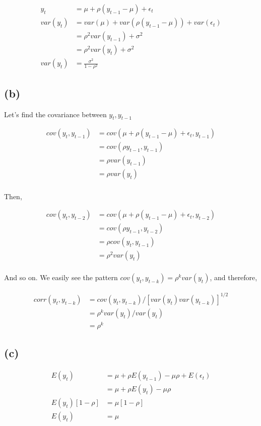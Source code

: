 \documentclass[11pt]{article}
\begin{document}
\begin{align*}
    y_t &= \mu + \rho(y_{t-1} -\mu) + \epsilon_t \\
     var(y_t) &= var(\mu) + var(\rho(y_{t-1} -\mu)) + var(\epsilon_t) \\
     &= \rho^2var(y_{t-1}) + \sigma^2\\
      &= \rho^2var(y_{t}) + \sigma^2\\
      var(y_t) &= \frac{\sigma^2}{1-\rho^2}
\end{align*}

\subsection*{(b)}

Let's find the covariance between $y_t, y_{t-1}$

\begin{align*}
    cov(y_t, y_{t-1}) &= cov(\mu + \rho(y_{t-1}-\mu) + \epsilon_t, y_{t-1})\\
    &= cov(\rho y_{t-1}, y_{t-1})\\
    &= \rho var(y_{t-1})\\
    &= \rho var(y_{t})\\
\end{align*}

Then, 


\begin{align*}
    cov(y_t, y_{t-2}) &= cov(\mu + \rho(y_{t-1}-\mu) + \epsilon_t, y_{t-2})\\
    &= cov(\rho y_{t-1}, y_{t-2})\\
    &= \rho cov(y_{t}, y_{t-1})\\
    &= \rho^2 var(y_{t})\\
\end{align*}

And so on. We easily see the pattern $cov(y_t, y_{t-k}) = \rho^kvar(y_t)$, and therefore,

\begin{align*}
    corr(y_t, y_{t-k}) &= cov(y_t, y_{t-k})/[var(y_t)var(y_{t-k})]^{1/2}\\
    &=\rho^k var(y_{t}) / var(y_{t})\\
    &=\rho^k
\end{align*}

\subsection*{(c)}
\begin{align*}
    E(y_t) &= \mu + \rho E(y_{t-1}) - \mu\rho + E(\epsilon_t)\\
    &= \mu + \rho E(y_{t}) - \mu\rho\\
    E(y_t)[1-\rho] &= \mu[1-\rho]\\
    E(y_t) &= \mu
\end{align*}
\end{document}
